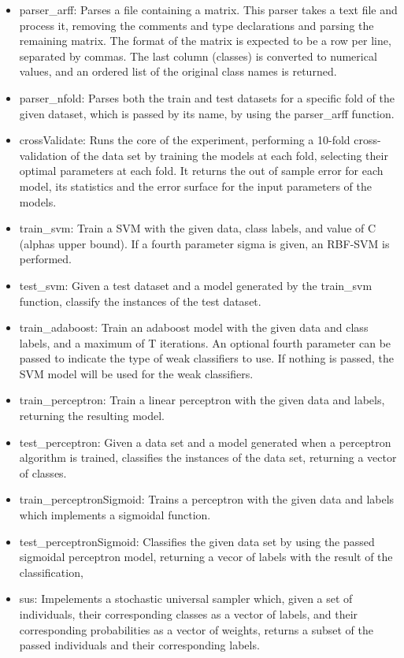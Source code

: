 \documentclass[10pt, journal]{IEEEtran}
\begin{document}
\begin{itemize}
\item parser\_arff: Parses a file containing a matrix. This parser takes a text file and process it, removing the comments and type declarations and parsing the remaining matrix. The format of the matrix is expected to be a row per line, separated by commas. The last column (classes) is converted to numerical values, and an ordered list of the original class names is returned.
\item parser\_nfold: Parses both the train and test datasets for a specific fold of the given dataset, which is passed by its name, by using the parser\_arff function.
\item crossValidate: Runs the core of the experiment, performing a 10-fold cross-validation of the data set by training the models at each fold, selecting their optimal parameters at each fold. It returns the out of sample error for each model, its statistics and the error surface for the input parameters of the models.
\item train\_svm: Train a SVM with the given data, class labels, and value of C (alphas upper bound). If a fourth parameter sigma is given, an RBF-SVM is performed.
\item test\_svm: Given a test dataset and a model generated by the train\_svm function, classify the instances of the test dataset.
\item train\_adaboost: Train an adaboost model with the given data and class labels, and a maximum of T iterations. An optional fourth parameter can be passed to indicate the type of weak classifiers to use. If nothing is passed, the SVM model will be used for the weak classifiers.
\item train\_perceptron: Train a linear perceptron with the given data and labels, returning the resulting model.
\item test\_perceptron: Given a data set and a model generated when a perceptron algorithm is trained, classifies the instances of the data set, returning a vector of classes.
\item train\_perceptronSigmoid: Trains a perceptron with the given data and labels which implements a sigmoidal function.
\item test\_perceptronSigmoid: Classifies the given data set by using the passed sigmoidal perceptron model, returning a vecor of labels with the result of the classification,
\item sus: Impelements a stochastic universal sampler which, given a set of individuals, their corresponding classes as a vector of labels, and their corresponding probabilities as a vector of weights, returns a subset of the passed individuals and their corresponding labels.

\end{itemize}
\end{document}
